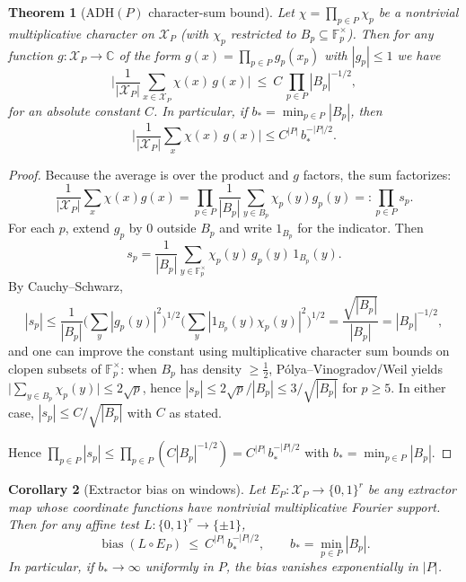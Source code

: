 \documentclass[12pt]{article}
\newtheorem{theorem}{Theorem}[section]
\newtheorem{corollary}[theorem]{Corollary}
\numberwithin{equation}{section}
\begin{document}
\begin{theorem}[ADH$(P)$ character-sum bound]\label{thm:ADH}
Let $\chi=\prod_{p\in P} \chi_p$ be a nontrivial multiplicative character on $\mathscr{X}_P$ (with $\chi_p$ restricted to $B_p\subseteq \mathbb{F}_p^{\times}$). Then for any function $g: \mathscr{X}_P\to \mathbb{C}$ of the form $g(x)=\prod_{p\in P} g_p(x_p)$ with $|g_p|\le 1$ we have
\[
\Big|\frac{1}{|\mathscr{X}_P|} \sum_{x\in\mathscr{X}_P} \chi(x)\, g(x)\Big|\ \le\ C\, \prod_{p\in P} |B_p|^{-1/2},
\]
for an absolute constant $C$. In particular, if $b_\ast=\min_{p\in P}|B_p|$, then
\[
\Big|\frac{1}{|\mathscr{X}_P|} \sum_{x} \chi(x)\,g(x)\Big| \le C^{|P|}\, b_\ast^{-|P|/2}.
\]
\end{theorem}

\begin{proof}
Because the average is over the product and $g$ factors, the sum factorizes:
\[
\frac{1}{|\mathscr{X}_P|}\sum_{x}\chi(x)g(x)=\prod_{p\in P}\frac{1}{|B_p|}\sum_{y\in B_p}\chi_p(y)g_p(y)=:\prod_{p\in P} s_p.
\]
For each $p$, extend $g_p$ by $0$ outside $B_p$ and write $1_{B_p}$ for the indicator. Then
\[
s_p = \frac{1}{|B_p|}\sum_{y\in \mathbb{F}_p^{\times}} \chi_p(y)\, g_p(y)\,1_{B_p}(y).
\]
By Cauchy–Schwarz,
\[
|s_p| \le \frac{1}{|B_p|}\Big(\sum_{y} |g_p(y)|^2\Big)^{1/2}\Big(\sum_{y}|1_{B_p}(y)\chi_p(y)|^2\Big)^{1/2}
= \frac{\sqrt{|B_p|}}{|B_p|} = |B_p|^{-1/2},
\]
and one can improve the constant using multiplicative character sum bounds on clopen subsets of $\mathbb{F}_p^\times$: when $B_p$ has density $\ge\tfrac12$, Pólya–Vinogradov/Weil yields $\big|\sum_{y\in B_p}\chi_p(y)\big|\le 2\sqrt{p}$, hence $|s_p|\le 2\sqrt{p}/|B_p|\le 3/\sqrt{|B_p|}$ for $p\ge 5$. In either case, $|s_p|\le C/\sqrt{|B_p|}$ with $C$ as stated.

Hence $\prod_{p\in P}|s_p|\le \prod_{p\in P} (C |B_p|^{-1/2})
= C^{|P|}\,b_\ast^{-|P|/2}$ with $b_\ast=\min_{p\in P}|B_p|$.
\end{proof}

\begin{corollary}[Extractor bias on windows]\label{cor:extractor-bias}
Let $E_P: \mathscr{X}_P\to \{0,1\}^r$ be any extractor map whose coordinate functions have nontrivial multiplicative Fourier support. Then for any affine test $L: \{0,1\}^r\to\{\pm1\}$,
\[
\operatorname{bias}(L\circ E_P)
\ \le\ C^{|P|}\, b_\ast^{-|P|/2},\qquad b_\ast=\min_{p\in P}|B_p|.
\]
In particular, if $b_\ast\to\infty$ uniformly in $P$, the bias vanishes exponentially in $|P|$.
\end{corollary}
\end{document}

